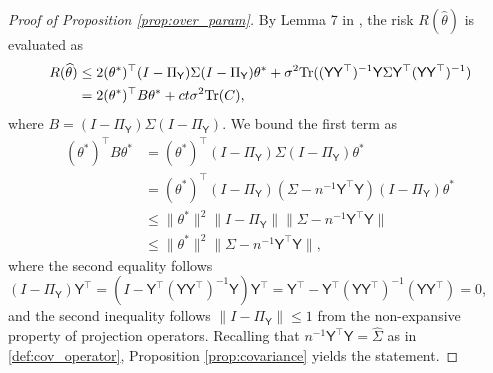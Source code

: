 \documentclass[11pt,a4paper]{article}
\theoremstyle{remark}
\theoremstyle{definition}
\theoremstyle{definition}
\renewcommand{\hat}{\widehat}
\newcommand{\rc}{\color{black}}
\begin{document}
\begin{bibunit}[apalike]
\begin{proof}[Proof of Proposition \ref{prop:over_param}]
By Lemma 7 in \citep{bartlett2020benign}, the risk $R(\hat{\theta})$ is evaluated as
\begin{align*}
    R(\hat{\theta}) &\leq 2 (\theta^*)^\top (I - \Pi_\mathsf{Y}) \Sigma (I - \Pi_\mathsf{Y})\theta^* + \sigma^2 \mathrm{\rc Tr}((\mathsf{Y} \mathsf{Y}^\top)^{-1} \mathsf{Y} \Sigma \mathsf{Y}^\top (\mathsf{Y} \mathsf{Y}^\top)^{-1}) \\
     & = 2 (\theta^*)^\top B \theta^* + c t \sigma^2 \mathrm{\rc Tr}(C),
\end{align*}
where $B= (I - \Pi_\mathsf{Y}) \Sigma (I - \Pi_\mathsf{Y})$.
We bound the first term as
\begin{align*}
     (\theta^*)^\top B \theta^* &=  (\theta^*)^\top (I - \Pi_\mathsf{Y}) \Sigma (I - \Pi_\mathsf{Y}) \theta^*  \\
     &=(\theta^*)^\top (I - \Pi_\mathsf{Y}) (\Sigma - n^{-1} \mathsf{Y}^\top \mathsf{Y}) (I - \Pi_\mathsf{Y}) \theta^*\\
     & \leq \|\theta^*\|^2 \| I - \Pi_\mathsf{Y}\| \|\Sigma - n^{-1} \mathsf{Y} ^\top \mathsf{Y}\| \\
     & \leq  \|\theta^*\|^2\|\Sigma - n^{-1} \mathsf{Y} ^\top \mathsf{Y}\|,
\end{align*}
where the second equality follows $(I - \Pi_\mathsf{Y})\mathsf{Y}^\top =  (I - \mathsf{Y}^\top (\mathsf{Y} \mathsf{Y}^\top)^{-1} \mathsf{Y}) \mathsf{Y}^\top = \mathsf{Y}^\top  - \mathsf{Y}^\top (\mathsf{Y} \mathsf{Y}^\top)^{-1} (\mathsf{Y} \mathsf{Y}^\top) = 0$, and the second inequality follows $\| I - \Pi_\mathsf{Y}\| \leq 1$ from the non-expansive property of projection operators.
Recalling that $n^{-1} \mathsf{Y}^\top \mathsf{Y} = \hat{\Sigma}$ as in \eqref{def:cov_operator}, Proposition \ref{prop:covariance} yields the statement.
\end{proof}

    

% 
% 
\putbib[main]
\end{bibunit}
\end{document}
